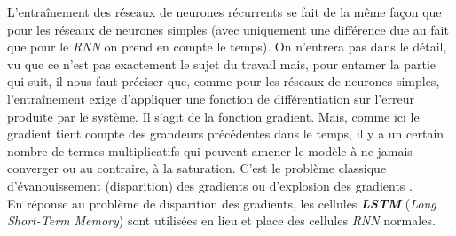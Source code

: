 L'entraînement des réseaux de neurones récurrents se fait de la même façon que pour les réseaux de neurones simples (avec uniquement une différence due au fait que pour le \textit{RNN} on prend en compte le temps). On n'entrera pas dans le détail, vu que ce n'est pas exactement le sujet du travail mais, pour entamer la partie qui suit, il nous faut préciser que, comme pour les réseaux de neurones simples, l'entraînement exige d'appliquer une fonction de différentiation sur l'erreur produite par le système. Il s'agit de la fonction gradient. Mais, comme ici le gradient tient compte des grandeurs précédentes dans le temps, il y a un certain nombre de termes multiplicatifs qui peuvent amener le modèle à ne jamais converger ou au contraire, à la saturation. C'est le problème classique d'é\-va\-noui\-sse\-ment (disparition) des gradients ou d'explosion des gradients \cite{ganegedara2018natural}.\\
En réponse au problème de disparition des gradients, les cellules \textbf{\textit{LSTM}} (\textit{Long Short-Term Memory}) sont utilisées en lieu et place des cellules \textit{RNN} normales.
